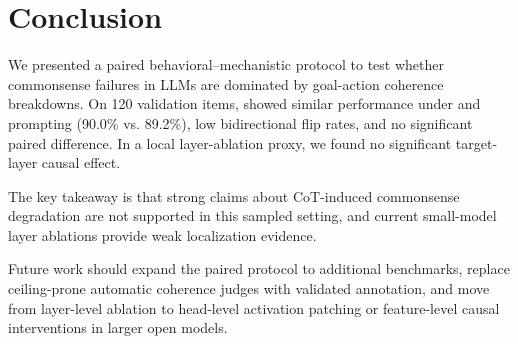 \section{Conclusion}
\label{sec:conclusion}

We presented a paired behavioral--mechanistic protocol to test whether commonsense failures in LLMs are dominated by goal-action coherence breakdowns. On 120 \csqa validation items, \gptapi showed similar performance under \direct and \cotprompt prompting (90.0\% vs. 89.2\%), low bidirectional flip rates, and no significant paired difference. In a local \proxy layer-ablation proxy, we found no significant target-layer causal effect.

The key takeaway is that strong claims about CoT-induced commonsense degradation are not supported in this sampled setting, and current small-model layer ablations provide weak localization evidence.

Future work should expand the paired protocol to additional benchmarks, replace ceiling-prone automatic coherence judges with validated annotation, and move from layer-level ablation to head-level activation patching or feature-level causal interventions in larger open models.
